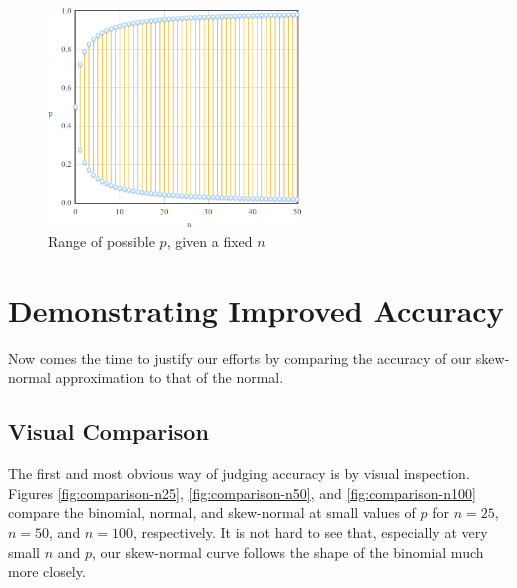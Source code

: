 \documentclass{article}
\begin{document}
\begin{figure}
  \centering
  \includegraphics[width=0.6\textwidth]{../images/restriction-p-range.png}
  \caption{Range of possible $p$, given a fixed $n$}
  \label{fig:sn-restriction-p-range}
\end{figure}

\section{Demonstrating Improved Accuracy}

Now comes the time to justify our efforts by comparing the accuracy of our
skew-normal approximation to that of the normal.

\subsection{Visual Comparison}

The first and most obvious way of judging accuracy is by visual inspection.
Figures \ref{fig:comparison-n25}, \ref{fig:comparison-n50}, and
\ref{fig:comparison-n100} compare the binomial, normal, and skew-normal at
small values of $p$ for $n=25$, $n=50$, and $n=100$, respectively. It is not
hard to see that, especially at very small $n$ and $p$, our skew-normal curve
follows the shape of the binomial much more closely.
\end{document}
